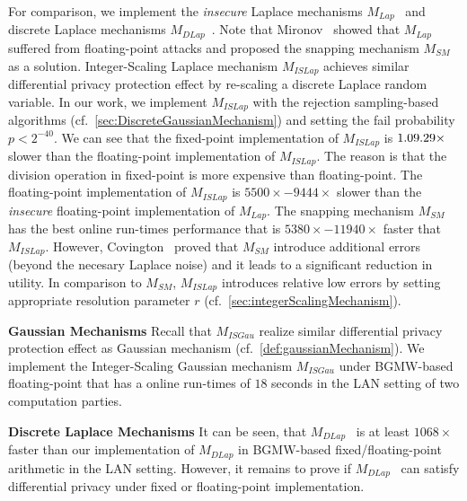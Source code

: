 For comparison, we implement the \textit{insecure} Laplace mechanisms $M_{Lap}$~\cite{eigner2014differentially} and discrete Laplace mechanisms $M_{DLap}$~\cite{eigner2014differentially}.
Note that Mironov~\cite{mironov2014differentially} showed that $M_{Lap}$~\cite{eigner2014differentially} suffered from floating-point attacks and proposed the snapping mechanism $M_{SM}$ as a solution.
Integer-Scaling Laplace mechanism $M_{ISLap} $ achieves similar differential privacy protection effect by re-scaling a discrete Laplace random variable. In our work, we implement $M_{ISLap} $ with the rejection sampling-based algorithms (cf.~\autoref{sec:DiscreteGaussianMechanism}) and setting the fail probability $p<2^{-40}$.
We can see that the fixed-point implementation of $M_{ISLap}$ is $1.09\time-1.29\times$ slower than the floating-point implementation of $M_{ISLap}$.
The reason is that the division operation in fixed-point is more expensive than floating-point.
The floating-point implementation of $M_{ISLap}$ is $5500\times-9444\times$ slower than the \textit{insecure} floating-point implementation of $M_{Lap}$.
The snapping mechanism $M_{SM}$ has the best online run-times performance that is $5380\times-11940\times $ faster that $M_{ISLap}$.
However, Covington~\cite{Covington2019} proved that $M_{SM}$ introduce additional errors (beyond the necesary Laplace noise) and it leads to a significant reduction in utility.
In comparison to $M_{SM}$, $M_{ISLap}$ introduces relative low errors by setting appropriate resolution parameter $r$ (cf.~\autoref{sec:integerScalingMechanism}).

\textbf{Gaussian Mechanisms}
Recall that $M_{ISGau}$ realize similar differential privacy protection effect as Gaussian mechanism (cf.~\autoref{def:gaussianMechanism}).
We implement the Integer-Scaling Gaussian mechanism $M_{ISGau}$ under BGMW-based floating-point that has a online run-times of $18$ seconds in the LAN setting of two computation parties.

\textbf{Discrete Laplace Mechanisms}
It can be seen, that $M_{DLap}$~\cite{eigner2014differentially} is at least $1068\times$ faster than our implementation of $M_{DLap}$ in BGMW-based fixed/floating-point arithmetic in the LAN setting. However, it remains to prove if $M_{DLap}$~\cite{eigner2014differentially} can satisfy differential privacy under fixed or floating-point implementation.




